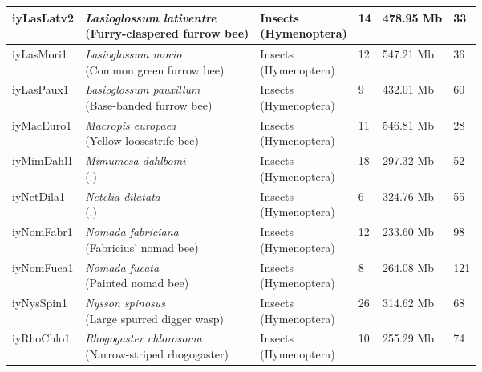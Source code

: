 \begin{centering}
\begin{longtable}{l|l|l|l|l|l}
iyLasLatv2 & \makecell[{l}]{\textit{Lasioglossum lativentre} \\ (Furry-claspered furrow bee)} & \makecell[{l}]{Insects \\ (Hymenoptera)} & 14 & 478.95 Mb & 33  \\ \hline
iyLasMori1 & \makecell[{l}]{\textit{Lasioglossum morio} \\ (Common green furrow bee)} & \makecell[{l}]{Insects \\ (Hymenoptera)} & 12 & 547.21 Mb & 36  \\ \hline
iyLasPaux1 & \makecell[{l}]{\textit{Lasioglossum pauxillum} \\ (Base-banded furrow bee)} & \makecell[{l}]{Insects \\ (Hymenoptera)} & 9 & 432.01 Mb & 60  \\ \hline
iyMacEuro1 & \makecell[{l}]{\textit{Macropis europaea} \\ (Yellow loosestrife bee)} & \makecell[{l}]{Insects \\ (Hymenoptera)} & 11 & 546.81 Mb & 28  \\ \hline
iyMimDahl1 & \makecell[{l}]{\textit{Mimumesa dahlbomi} \\ (.)} & \makecell[{l}]{Insects \\ (Hymenoptera)} & 18 & 297.32 Mb & 52  \\ \hline
iyNetDila1 & \makecell[{l}]{\textit{Netelia dilatata} \\ (.)} & \makecell[{l}]{Insects \\ (Hymenoptera)} & 6 & 324.76 Mb & 55  \\ \hline
iyNomFabr1 & \makecell[{l}]{\textit{Nomada fabriciana} \\ (Fabricius' nomad bee)} & \makecell[{l}]{Insects \\ (Hymenoptera)} & 12 & 233.60 Mb & 98  \\ \hline
iyNomFuca1 & \makecell[{l}]{\textit{Nomada fucata} \\ (Painted nomad bee)} & \makecell[{l}]{Insects \\ (Hymenoptera)} & 8 & 264.08 Mb & 121  \\ \hline
iyNysSpin1 & \makecell[{l}]{\textit{Nysson spinosus} \\ (Large spurred digger wasp)} & \makecell[{l}]{Insects \\ (Hymenoptera)} & 26 & 314.62 Mb & 68  \\ \hline
iyRhoChlo1 & \makecell[{l}]{\textit{Rhogogaster chlorosoma} \\ (Narrow-striped rhogogaster)} & \makecell[{l}]{Insects \\ (Hymenoptera)} & 10 & 255.29 Mb & 74  \\ \hline

\end{longtable}
\end{centering}
